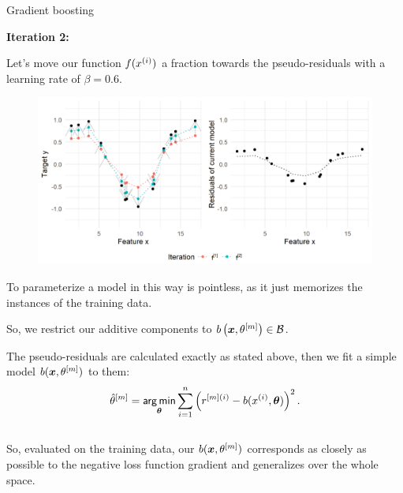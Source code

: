 \begin{vbframe}{Gradient boosting}
\framebreak

\textbf{Iteration 2:}

Let's move our function $f(x^{(i)})$ a fraction towards the pseudo-residuals with a learning rate of $\beta = 0.6$.


\begin{figure}
  \includegraphics[width=\textwidth]{figure/fig-gb-concept-pseudo-resi-2.png}
\end{figure}

\framebreak
\begin{footnotesize}




To parameterize a model in this way is pointless,
as it just memorizes the instances of the training data.

\vspace*{0.3cm}


So, we restrict our additive components to $b\left(\bm{x}, \theta^{[m]}\right) \in \mathcal{B}$.


The pseudo-residuals are calculated exactly as stated above,
then we fit a simple model $b(\bm{x}, \theta^{[m]})$ to them:
$$ \hat{\theta}^{[m]} = \mathop{\sf arg\,min}_{\bm{\theta}} \sum_{i=1}^n \left(r^{[m](i)} - b(x^{(i)}, \bm{\theta})\right)^2. $$

\lz

\begin{columns}
\column{5cm}
So, evaluated on the training data,
our $b(\bm{x}, \theta^{[m]})$ corresponds as closely as possible to the negative
loss function gradient and generalizes over the whole space.



\end{columns}
\end{footnotesize}
\end{vbframe}
